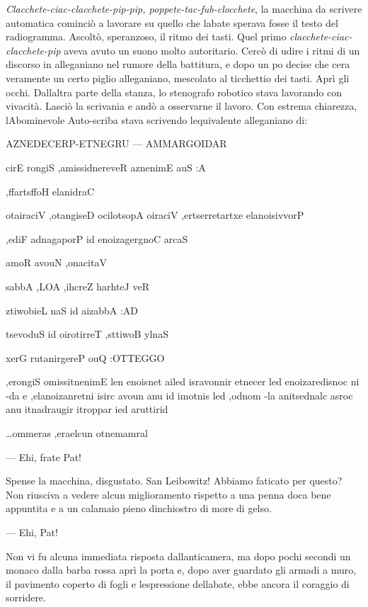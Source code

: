 	\emph{Clacchete-ciac-clacchete-pip-pip, poppete-tac-fub-clocchete}, la
	macchina da scrivere automatica cominciò a lavorare su quello che
	l\textquotesingle abate sperava fosse il testo del radiogramma. Ascoltò,
	speranzoso, il ritmo dei tasti. Quel primo
	\emph{clacchete-ciac-clacchete-pip} aveva avuto un suono molto
	autoritario. Cercò di udire i ritmi di un discorso in alleganiano nel
	rumore della battitura, e dopo un po\textquotesingle{} decise che
	c\textquotesingle era veramente un certo piglio alleganiano, mescolato
	al ticchettio dei tasti. Aprì gli occhi. Dall\textquotesingle altra
	parte della stanza, lo stenografo robotico stava lavorando con vivacità.
	Lasciò la scrivania e andò a osservarne il lavoro. Con estrema
	chiarezza, l\textquotesingle Abominevole Auto-scriba stava scrivendo
	l\textquotesingle equivalente alleganiano di:
	
	\begin{flushright}
		AZNEDECERP-ETNEGRU --- AMMARGOIDAR
		
		cirE rongiS ,amissidnereveR aznenimE auS :A
		
		,ffartsffoH elanidraC
		
		otairaciV ,otangiseD ocilotsopA oiraciV ,ertserretartxe elanoisivvorP
		
		,ediF adnagaporP id enoizagergnoC arcaS
		
		amoR avouN ,onacitaV
		
		sabbA ,LOA ,ihcreZ harhteJ veR
		
		ztiwobieL naS id aizabbA :AD
		
		tsevoduS id oirotirreT ,sttiwoB ylnaS
		
		xerG rutanirgereP ouQ :OTTEGGO
		
		,erongiS omissitnenimE len enoisnet ailed isravonnir etnecer led
		enoizaredisnoc ni -da e ,elanoizanretni isirc avoun anu id imotnis led
		,odnom -la anitsednalc asroc anu itnadraugir itroppar ied aruttirid
		
		\ldots ommeras ,eraelcun otnemamra\textquotesingle l	
	\end{flushright}
	
	
	--- Ehi, frate Pat!
	
	Spense la macchina, disgustato. San Leibowitz! Abbiamo faticato per
	questo? Non riusciva a vedere alcun miglioramento rispetto a una penna
	d\textquotesingle oca bene appuntita e a un calamaio pieno
	d\textquotesingle inchiostro di more di gelso.
	
	--- Ehi, Pat!
	
	Non vi fu alcuna immediata risposta dall\textquotesingle anticamera, ma
	dopo pochi secondi un monaco dalla barba rossa aprì la porta e, dopo
	aver guardato gli armadi a muro, il pavimento coperto di fogli e
	l\textquotesingle espressione dell\textquotesingle abate, ebbe ancora il
	coraggio di sorridere.
	
